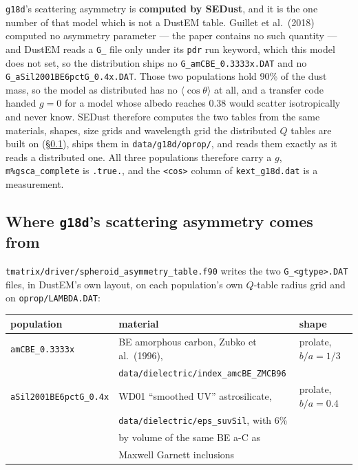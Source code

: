 \documentclass{my_memo}
\newcommand{\code}[1]{\texttt{#1}}
\begin{document}
\medskip
\noindent \code{g18d}'s scattering asymmetry is \textbf{computed by SEDust}, and
it is the one number of that model which is not a DustEM table.
Guillet et al.\ (2018) computed no asymmetry parameter --- the paper contains no
such quantity --- and DustEM reads a \code{G\_} file only under its \code{pdr}
run keyword, which this model does not set, so the distribution ships no
\code{G\_amCBE\_0.3333x.DAT} and no \code{G\_aSil2001BE6pctG\_0.4x.DAT}. Those
two populations hold 90\% of the dust mass, so the model as distributed has no
$\langle\cos\theta\rangle$ at all, and a transfer code handed $g = 0$ for a
model whose albedo reaches $0.38$ would scatter isotropically and never know.
SEDust therefore computes the two tables from the same materials, shapes, size
grids and wavelength grid the distributed $Q$ tables are built on
(\S\ref{sec:g18d-gsca}), ships them in \code{data/g18d/oprop/}, and reads them
exactly as it reads a distributed one. All three populations therefore carry a
$g$, \code{m\%gsca\_complete} is \code{.true.}, and the \code{<cos>} column of
\code{kext\_g18d.dat} is a measurement.

\subsection{Where \code{g18d}'s scattering asymmetry comes
from}\label{sec:g18d-gsca}

\code{tmatrix/driver/spheroid\_asymmetry\_table.f90} writes the two
\code{G\_<gtype>.DAT} files, in DustEM's own layout, on each population's own
$Q$-table radius grid and on \code{oprop/LAMBDA.DAT}:

\begin{center}
\begin{tabular}{@{}lll@{}}
\toprule
population & material & shape \\
\midrule
\code{amCBE\_0.3333x} & BE amorphous carbon, Zubko et al.\ (1996),
   & prolate, $b/a = 1/3$ \\
   & \code{data/dielectric/index\_amcBE\_ZMCB96} & \\
\code{aSil2001BE6pctG\_0.4x} & WD01 ``smoothed UV'' astrosilicate,
   & prolate, $b/a = 0.4$ \\
   & \code{data/dielectric/eps\_suvSil}, with 6\% & \\
   & by volume of the same BE a-C as & \\
   & Maxwell Garnett inclusions & \\
\bottomrule
\end{tabular}
\end{center}
\end{document}
